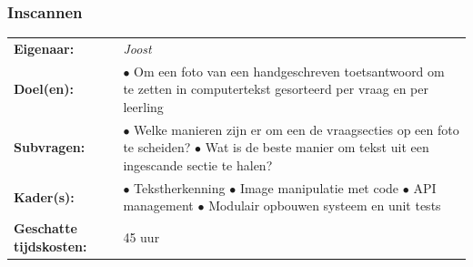 \documentclass[12pt]{article}
\begin{document}
\subsubsection{Inscannen}
\begin{tabularx}{\linewidth}{@{}ll}
    \textbf{Eigenaar: } & \textit{Joost} \\
    \textbf{Doel(en): } & 
        \makecell[tl]{
            $\bullet$  Om een foto van een handgeschreven toetsantwoord om te zetten\\ in computertekst gesorteerd per vraag en per leerling\\
        } \\
    \textbf{Subvragen: } & 
        \makecell[tl]{
            $\bullet$ Welke manieren zijn er om een de vraagsecties op een foto te scheiden? \\
            $\bullet$ Wat is de beste manier om tekst uit een ingescande sectie te halen? \\
        }\\
    \textbf{Kader(s): } & 
        \makecell[tl]{
            $\bullet$ Tekstherkenning\\
            $\bullet$ Image manipulatie met code\\
            $\bullet$ API management\\
            $\bullet$ Modulair opbouwen systeem en unit tests\\
        }\\
    \parbox[t]{3cm}{\raggedright\textbf{Geschatte  tijdskosten:} } & 45 uur \\
\end{tabularx}
\end{document}
